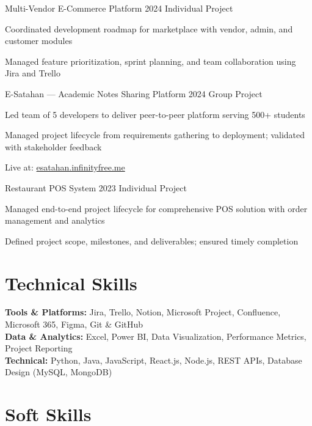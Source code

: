 \documentclass[letterpaper,10.8pt]{article}
\begin{document}
{Multi-Vendor E-Commerce Platform}
{2024}
{Individual Project}{
  \item Coordinated development roadmap for marketplace with vendor, admin, and customer modules
  \item Managed feature prioritization, sprint planning, and team collaboration using Jira and Trello
}

\vspace{8pt}

{E-Satahan — Academic Notes Sharing Platform}
{2024}
{Group Project}{
  \item Led team of 5 developers to deliver peer-to-peer platform serving 500+ students
  \item Managed project lifecycle from requirements gathering to deployment; validated with stakeholder feedback
  \item Live at: \href{https://esatahan.infinityfree.me}{esatahan.infinityfree.me}
}

\vspace{8pt}

{Restaurant POS System}
{2023}
{Individual Project}{
  \item Managed end-to-end project lifecycle for comprehensive POS solution with order management and analytics
  \item Defined project scope, milestones, and deliverables; ensured timely completion
}

\newpage

\section{Technical Skills}
\vspace{-1pt}

\textbf{Tools \& Platforms:} Jira, Trello, Notion, Microsoft Project, Confluence, Microsoft 365, Figma, Git \& GitHub\\[4pt]
\textbf{Data \& Analytics:} Excel, Power BI, Data Visualization, Performance Metrics, Project Reporting\\[4pt]
\textbf{Technical:} Python, Java, JavaScript, React.js, Node.js, REST APIs, Database Design (MySQL, MongoDB)

\section{Soft Skills}
\vspace{-1pt}
\end{document}
